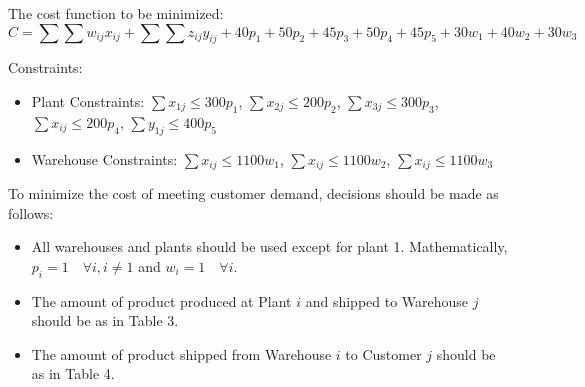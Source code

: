 \documentclass{article}
\begin{document}
The cost function to be minimized: 
\begin{equation}
    C = \sum \sum w_{ij} x_{ij} + \sum \sum z_{ij} y_{ij} + 40p_1 + 50p_2 + 45p_3 + 50p_4 + 45p_5 + 30w_1 + 40w_2 + 30w_3
\end{equation}

Constraints:
\begin{itemize}
    \item Plant Constraints: $\sum{x_{1j}} \leq 300p_1$, $\sum{x_{2j}} \leq 200p_2$, $\sum{x_{3j}} \leq 300p_3$, $\sum{x_{ij}} \leq 200p_4$, $\sum{y_{1j}} \leq 400p_5$
    \item Warehouse Constraints: $\sum{x_{ij}} \leq 1100w_1$, $\sum{x_{ij}} \leq 1100w_2$, $\sum{x_{ij}} \leq 1100w_3$
\end{itemize}

To minimize the cost of meeting customer demand, decisions should be made as follows:

\begin{itemize}
    \item All warehouses and plants should be used except for plant 1. Mathematically, $p_i = 1 \quad \forall i, i \neq 1$ and $w_i = 1 \quad \forall i$.
    \item The amount of product produced at Plant $i$ and shipped to Warehouse $j$ should be as in Table 3.
    \item The amount of product shipped from Warehouse $i$ to Customer $j$ should be as in Table 4.
\end{itemize}
\end{document}
